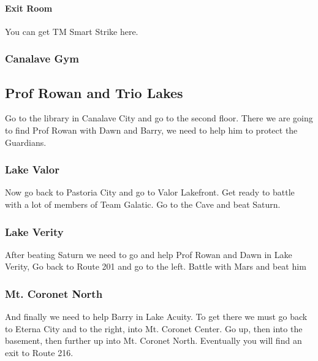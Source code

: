 \documentclass[11pt]{article}
\begin{document}



\paragraph{Exit Room}
You can get TM Smart Strike here.



\subsubsection{Canalave Gym}

\subsection{Prof Rowan and Trio Lakes}\label{subsec:prof-rowan-and-trio-lakes}
Go to the library in Canalave City and go to the second floor.
There we are going to find Prof Rowan with Dawn and Barry,
we need to help him to protect the Guardians.

\subsubsection{Lake Valor}\label{subsubsec:lake-valor}
Now go back to Pastoria City and go to Valor Lakefront.
Get ready to battle with a lot of members of Team Galatic.
Go to the Cave and beat Saturn.





\subsubsection{Lake Verity}\label{subsubsec:lake-verity}
After beating Saturn we need to go and help Prof Rowan and Dawn in Lake Verity, Go back to Route 201 and go to the left.
Battle with Mars and beat him

\subsubsection{Mt. Coronet North}\label{subsubsec:mt.-coronet-north}
And finally we need to help Barry in Lake Acuity.
To get there we must go back to Eterna City and to the right, into Mt. Coronet Center.
Go up, then into the basement, then further up into Mt. Coronet North.
Eventually you will find an exit to Route 216.
\end{document}
